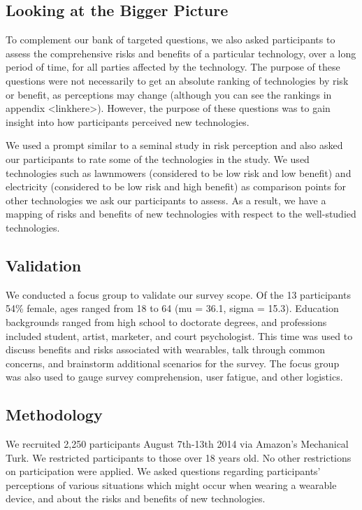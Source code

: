 \documentclass{acm_proc_article-sp}
\begin{document}
\subsection{Looking at the Bigger Picture}

To complement our bank of targeted questions, we also asked participants to assess the comprehensive risks and benefits of a particular technology, over a long period of time, for all parties affected by the technology. The purpose of these questions were not necessarily to get an absolute ranking of technologies by risk or benefit, as perceptions may change (although you can see the rankings in appendix <linkhere>). However, the purpose of these questions was to gain insight into how participants perceived new technologies.

We used a prompt similar to a seminal study in risk perception \cite{Fischhoff} and also asked our participants to rate some of the technologies in the study. We used technologies such as lawnmowers (considered to be low risk and low benefit) and electricity (considered to be low risk and high benefit) as comparison points for other technologies we ask our participants to assess. As a result, we have a mapping of risks and benefits of new technologies with respect to the well-studied technologies. 

\subsection{Validation}
We conducted a focus group to validate our survey scope. Of the 13 participants 54\% female, ages ranged from 18 to 64 (mu = 36.1, sigma = 15.3).  Education backgrounds ranged from high school to doctorate degrees, and professions included student, artist, marketer, and court psychologist. This time was used to discuss benefits and risks associated with wearables, talk through common concerns, and brainstorm additional scenarios for the survey. The focus group was also used to gauge survey comprehension, user fatigue, and other logistics. 

\subsection{Methodology}
We recruited 2,250 participants August 7th-13th 2014 via Amazon's Mechanical Turk. We restricted participants to those over 18 years old. No other restrictions on participation were applied. We asked questions regarding participants' perceptions of various situations which might occur when wearing a wearable device, and about the risks and benefits of new technologies.
 
\end{document}
